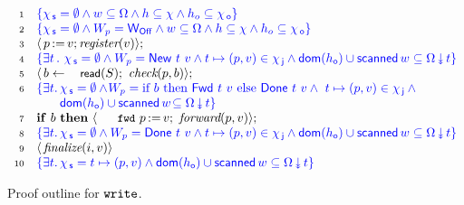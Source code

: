 \begin{figure}[t]
\[
\begin{array}[t]{r l}
  \num{1} & \specK{\{ \histS = \hempty  \wedge
                      w \subseteq \stableorder \wedge h \subseteq \hist \wedge h_o \subseteq \histO \}} \\
  \num{2} & \specK{\{ \histS = \hempty \wedge \wpp =\wInit \wedge
                      w \subseteq \stableorder \wedge h \subseteq \hist \wedge h_o \subseteq \histO \}}\\
  \num{3} &\lat\,\actwrite{p}{v}; \aux{register}(v) \rat; \\
  \num{4} & \specK{\{\exists t\, \ldot\,
                      \histS = \hempty \wedge
                      \wpp = \wWrite\ t\ v \wedge t\hpts(p,v) \in \histJ \wedge
                      \dom{h_{\othersub}} \cup \scanned{w}
                      \subseteq \sideal{\stableorder}{t}\}}\\
  \num{5} & \lat\, b \tbnd \act{read}(S);\ \aux{check}(p,b) \rat;\\
  \num{6} & \specK{\{\exists t\ldot \histS = \hempty \wedge\!
               \wpp =  \textrm{if}\ b\
               \textrm{then}\ \wDirty\ t\ v\ \textrm{else}\ \wClean\ t\ v \wedge\ t\hpts(p,v) \in \histJ \wedge \hbox{}}\\
          & \specK{\hphantom{\{\exists t\ldot \hbox{}}
              \dom{h_{\othersub}} \cup \scanned{w}\!
                   \subseteq \sideal{\stableorder}{t} 
               \}}\\
  \num{7} & \kw{if}\ b\ \kw{then}\ \lat\, \actwrite{\aleksfwdp{p}}{v};\ \aux{forward}(p,v)\rat;\\
  \num{8} & \specK{\{\exists t\ldot \histS = \hempty \wedge
                \wpp = \wClean\ t\ v \wedge t\hpts(p, v) \in \histJ \wedge
                \dom{h_{\othersub}} \cup \scanned{w} \subseteq \sideal{\stableorder}{t} \}}\\
  \num{9} & \lat\,\aux{finalize}(i,v)\rat \\
  \num{10} & \specK{\{\exists t\ldot \histS = t \hpts (p,v) \wedge
              \dom{h_{\othersub}} \cup \scanned{w} \subseteq \sideal{\stableorder}{t} \}}
\end{array}
\]
  \caption{\label{proof:write} Proof outline for $\texttt{write}$.}
\end{figure}
